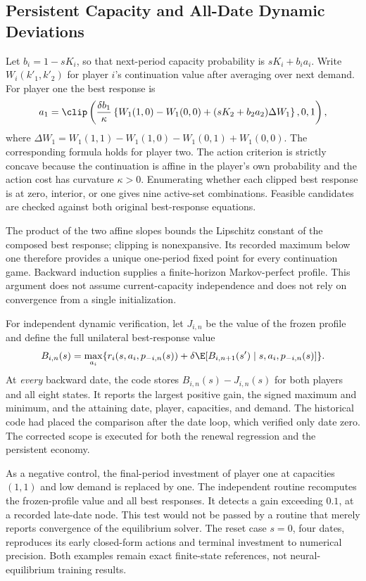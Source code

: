 \subsection{Persistent Capacity and All-Date Dynamic Deviations}
Let $b_i=1-sK_i$, so that next-period capacity probability is $sK_i+b_i a_i$. Write $W_i(k'_1,k'_2)$ for player $i$'s continuation value after averaging over next demand. For player one the best response is
\begin{equation}
 a_1=\clip\left(
 \frac{\delta b_1}{\kappa}
 \left\{W_1(1,0)-W_1(0,0)+(sK_2+b_2a_2)\Delta W_1\right\},0,1\right),
 \label{eq:game_persistent_br}
\end{equation}
where $\Delta W_1=W_1(1,1)-W_1(1,0)-W_1(0,1)+W_1(0,0)$. The corresponding formula holds for player two. The action criterion is strictly concave because the continuation is affine in the player's own probability and the action cost has curvature $\kappa>0$. Enumerating whether each clipped best response is at zero, interior, or one gives nine active-set combinations. Feasible candidates are checked against both original best-response equations.

The product of the two affine slopes bounds the Lipschitz constant of the composed best response; clipping is nonexpansive. Its recorded maximum below one therefore provides a unique one-period fixed point for every continuation game. Backward induction supplies a finite-horizon Markov-perfect profile. This argument does not assume current-capacity independence and does not rely on convergence from a single initialization.

For independent dynamic verification, let $J_{i,n}$ be the value of the frozen profile and define the full unilateral best-response value
\[
 B_{i,n}(s)=\max_{a_i}\{r_i(s,a_i,p_{-i,n}(s))+
 \delta\E[B_{i,n+1}(s')\mid s,a_i,p_{-i,n}(s)]\}.
\]
At \emph{every} backward date, the code stores $B_{i,n}(s)-J_{i,n}(s)$ for both players and all eight states. It reports the largest positive gain, the signed maximum and minimum, and the attaining date, player, capacities, and demand. The historical code had placed the comparison after the date loop, which verified only date zero. The corrected scope is executed for both the renewal regression and the persistent economy.

As a negative control, the final-period investment of player one at capacities $(1,1)$ and low demand is replaced by one. The independent routine recomputes the frozen-profile value and all best responses. It detects a gain exceeding $0.1$, at a recorded late-date node. This test would not be passed by a routine that merely reports convergence of the equilibrium solver. The reset case $s=0$, four dates, reproduces its early closed-form actions and terminal investment to numerical precision. Both examples remain exact finite-state references, not neural-equilibrium training results.

